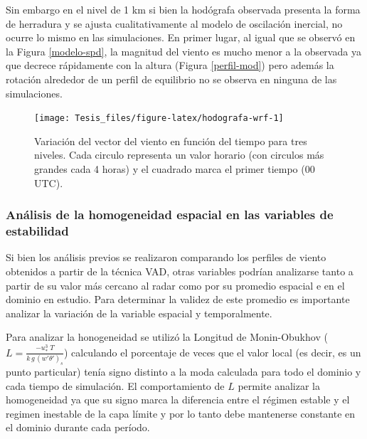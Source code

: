 \documentclass[12pt,spanish,oneside, a4paper]{book}
\begin{document}
Sin embargo en el nivel de 1 km si bien la hodógrafa observada presenta
la forma de herradura y se ajusta cualitativamente al modelo de
oscilación inercial, no ocurre lo mismo en las simulaciones. En primer
lugar, al igual que se observó en la Figura \ref{modelo-spd}, la
magnitud del viento es mucho menor a la observada ya que decrece
rápidamente con la altura (Figura \ref{perfil-mod}) pero además la
rotación alrededor de un perfil de equilibrio no se observa en ninguna
de las simulaciones.

\begin{figure}

{\centering \texttt{[image: Tesis\_files/figure-latex/hodografa-wrf-1]} 

}

\caption{Variación del vector del viento en función del tiempo para tres niveles. Cada circulo representa un valor horario (con circulos más grandes cada 4 horas) y el cuadrado marca el primer tiempo (00 UTC). \label{hodografa-mod}}\label{fig:hodografa-wrf}
\end{figure}

\subsubsection{Análisis de la homogeneidad espacial en las variables de
estabilidad}\label{analisis-de-la-homogeneidad-espacial-en-las-variables-de-estabilidad}

Si bien los análisis previos se realizaron comparando los perfiles de
viento obtenidos a partir de la técnica VAD, otras variables podrían
analizarse tanto a partir de su valor más cercano al radar como por su
promedio espacial e en el dominio en estudio. Para determinar la validez
de este promedio es importante analizar la variación de la variable
espacial y temporalmente.

Para analizar la honogeneidad se utilizó la Longitud de Monin-Obukhov
(\(L = \frac{-u_*^3 \;T}{k \, g \, (w'\theta ')_s}\)) calculando el
porcentaje de veces que el valor local (es decir, es un punto
particular) tenía signo distinto a la moda calculada para todo el
dominio y cada tiempo de simulación. El comportamiento de \(L\) permite
analizar la homogeneidad ya que su signo marca la diferencia entre el
régimen estable y el regimen inestable de la capa límite y por lo tanto
debe mantenerse constante en el dominio durante cada período.
\end{document}

